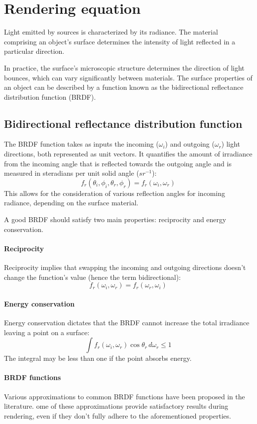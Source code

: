 \section{Rendering equation}

Light emitted by sources is characterized by its radiance. 
The material comprising an object's surface determines the intensity of light reflected in a particular direction.

In practice, the surface's microscopic structure determines the direction of light bounces, which can vary significantly between materials.
The surface properties of an object can be described by a function known as the bidirectional reflectance distribution function (BRDF).

\subsection{Bidirectional reflectance distribution function}
The BRDF function takes as inputs the incoming ($\omega_i$) and outgoing ($\omega_r$) light directions, both represented as unit vectors.
It quantifies the amount of irradiance from the incoming angle that is reflected towards the outgoing angle and is measured in steradians per unit solid angle ($sr^{-1}$):
\[f_r(\theta_i,\phi_i,\theta_r,\phi_r)=f_r(\omega_i,\omega_r)\]
This allows for the consideration of various reflection angles for incoming radiance, depending on the surface material.

A good BRDF should satisfy two main properties: reciprocity and energy conservation. 

\paragraph*{Reciprocity}
Reciprocity implies that swapping the incoming and outgoing directions doesn't change the function's value (hence the term bidirectional):
\[f_r(\omega_i,\omega_r)=f_r(\omega_r,\omega_i)\]

\paragraph*{Energy conservation}
Energy conservation dictates that the BRDF cannot increase the total irradiance leaving a point on a surface:
\[\int f_r(\omega_i,\omega_r)\cos\theta_r\, d\omega_r \leq 1\]
The integral may be less than one if the point absorbs energy.

\paragraph*{BRDF functions}
Various approximations to common BRDF functions have been proposed in the literature.
ome of these approximations provide satisfactory results during rendering, even if they don't fully adhere to the aforementioned properties.

